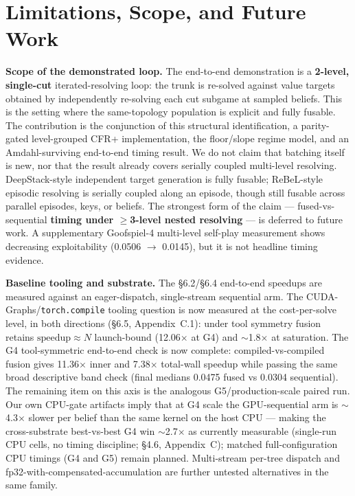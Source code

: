 \documentclass[11pt]{article}
\begin{document}
\section{Limitations, Scope, and Future Work}

\textbf{Scope of the demonstrated loop.} The end-to-end demonstration is a
\textbf{2-level, single-cut} iterated-resolving loop: the trunk is re-solved against
value targets obtained by independently re-solving each cut subgame at sampled beliefs.
This is the setting where the same-topology population is explicit and fully fusable.
The contribution is the conjunction of this structural identification, a parity-gated
level-grouped CFR+ implementation, the floor/slope regime model, and an
Amdahl-surviving end-to-end timing result. We do not claim that batching itself is new,
nor that the result already covers serially coupled multi-level resolving. DeepStack-style
independent target generation is fully fusable; ReBeL-style episodic resolving is
serially coupled along an episode, though still fusable across parallel episodes, keys,
or beliefs. The strongest form of the claim --- fused-vs-sequential \textbf{timing
under $\geq$3-level nested resolving} --- is deferred to future work. A supplementary
Goofspiel-4 multi-level self-play measurement shows decreasing exploitability
(0.0506 $\to$ 0.0145), but it is not headline timing evidence.

\textbf{Baseline tooling and substrate.} The \S6.2/\S6.4 end-to-end speedups are
measured against an eager-dispatch, single-stream sequential arm. The
CUDA-Graphs/\texttt{torch.compile} tooling question is now measured at the
cost-per-solve level, in both directions (\S6.5, Appendix~C.1): under tool symmetry
fusion retains $\text{speedup} \approx N$ launch-bound (12.06$\times$ at G4) and
$\sim$1.8$\times$ at saturation. The G4 tool-symmetric end-to-end check is now complete:
compiled-vs-compiled fusion gives 11.36$\times$ inner and 7.38$\times$ total-wall
speedup while passing the same broad descriptive band check (final medians 0.0475 fused
vs 0.0304 sequential). The remaining item on this axis is the analogous
G5/production-scale paired run. Our own CPU-gate artifacts imply that
at G4 scale the GPU-sequential arm is $\sim$4.3$\times$ slower per belief than the same
kernel on the host CPU --- making the cross-substrate best-vs-best G4 win
$\sim$2.7$\times$ as currently measurable (single-run CPU cells, no timing discipline;
\S4.6, Appendix~C); matched full-configuration CPU timings (G4 and G5) remain planned.
Multi-stream per-tree dispatch and fp32-with-compensated-accumulation are further
untested alternatives in the same family.
\end{document}
